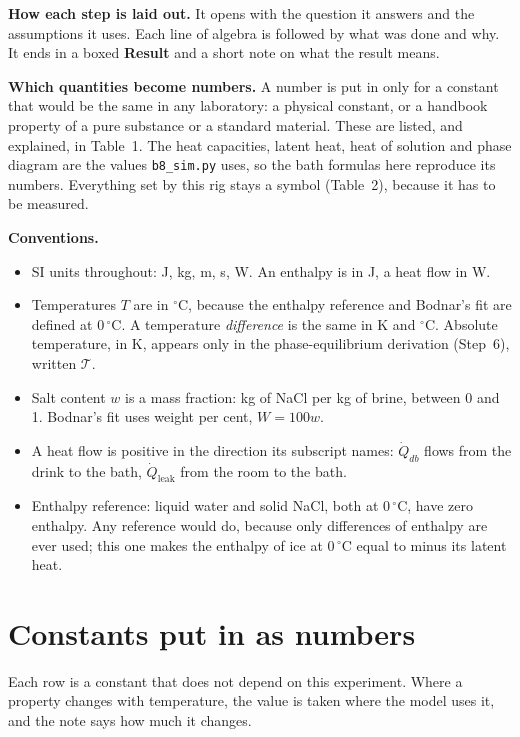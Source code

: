 \documentclass[11pt,a4paper]{article}
\newcommand{\Qdb}{\dot Q_{db}}
\newcommand{\Tabs}{\mathcal{T}}
\newcommand{\dC}{\,{}^{\circ}\mathrm{C}}
\newcommand{\step}[1]{\section*{#1}\addcontentsline{toc}{section}{#1}}
\begin{document}
\textbf{How each step is laid out.} It opens with the question it answers and the assumptions it uses.
Each line of algebra is followed by what was done and why. It ends in a boxed \textbf{Result} and a
short note on what the result means.

\textbf{Which quantities become numbers.} A number is put in only for a constant that would be the same
in any laboratory: a physical constant, or a handbook property of a pure substance or a standard
material. These are listed, and explained, in Table~1. The heat capacities, latent heat, heat of solution and
phase diagram are the values \texttt{b8\_sim.py} uses, so the bath formulas here reproduce its numbers. Everything set by this rig stays a symbol (Table~2), because it
has to be measured.

\textbf{Conventions.}
\begin{itemize}
  \item SI units throughout: J, kg, m, s, W. An enthalpy is in J, a heat flow in W.
  \item Temperatures $T$ are in $^\circ$C, because the enthalpy reference and Bodnar's fit are defined
        at $0\dC$. A temperature \emph{difference} is the same in K and $^\circ$C. Absolute temperature,
        in K, appears only in the phase-equilibrium derivation (Step~6), written $\Tabs$.
  \item Salt content $w$ is a mass fraction: kg of NaCl per kg of brine, between 0 and 1. Bodnar's fit
        uses weight per cent, $W = 100w$.
  \item A heat flow is positive in the direction its subscript names: $\Qdb$ flows from the drink to the
        bath, $\dot Q_{\mathrm{leak}}$ from the room to the bath.
  \item Enthalpy reference: liquid water and solid NaCl, both at $0\dC$, have zero enthalpy. Any
        reference would do, because only differences of enthalpy are ever used; this one makes the
        enthalpy of ice at $0\dC$ equal to minus its latent heat.
\end{itemize}

\step{Constants put in as numbers}

Each row is a constant that does not depend on this experiment. Where a property changes with
temperature, the value is taken where the model uses it, and the note says how much it changes.
\end{document}
